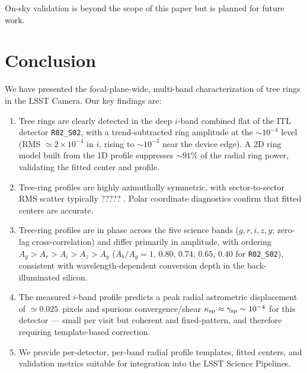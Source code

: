 On-sky validation is beyond the scope of this paper but is planned for future work.

\section{Conclusion} \label{sec:conclusions}

We have presented the focal-plane-wide, multi-band characterization of tree rings in the LSST Camera. Our key findings are:

\begin{enumerate}
\item Tree rings are clearly detected in the deep $i$-band combined flat of the ITL detector
\texttt{R02\_S02}, with a trend-subtracted ring amplitude at the $\sim10^{-4}$ level
(RMS $\simeq2\times10^{-4}$ in $i$, rising to $\sim10^{-3}$ near the device edge). A 2D ring
model built from the 1D profile suppresses $\sim91\%$ of the radial ring power, validating the
fitted center and profile.

\item Tree-ring profiles are highly azimuthally symmetric, with sector-to-sector RMS scatter typically ????? . Polar coordinate diagnostics confirm that fitted centers are accurate.

\item Tree-ring profiles are in phase across the five science bands ($g,r,i,z,y$; zero-lag
cross-correlation) and differ primarily in amplitude, with ordering
$A_g > A_r > A_i > A_z > A_y$ ($A_b/A_g = 1,\,0.80,\,0.74,\,0.65,\,0.40$ for \texttt{R02\_S02}),
consistent with wavelength-dependent conversion depth in the back-illuminated silicon.

\item The measured $i$-band profile predicts a peak radial astrometric displacement of
$\simeq0.025$~pixels and spurious convergence/shear $\kappa_{\rm sp}\approx\gamma_{\rm sp}\sim
10^{-4}$ for this detector --- small per visit but coherent and fixed-pattern, and therefore
requiring template-based correction.

\item We provide per-detector, per-band radial profile templates, fitted centers, and validation metrics suitable for integration into the LSST Science Pipelines.
\end{enumerate}


